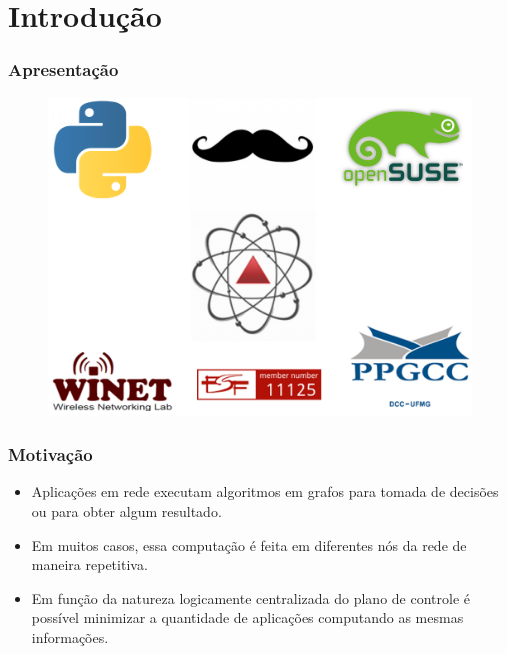 %
%
\section{Introdução}


%
%
\begin{frame}\frametitle{Apresentação}

	\begin{figure}[h]
        \centering
        \includegraphics[scale=0.25]{images/community.png}
    \end{figure}
\end{frame}


%
%
\begin{frame}\frametitle{Motivação}
   
    \begin{itemize}
        \setlength{\itemsep}{1cm}
        \item Aplicações em rede executam algoritmos em grafos para tomada de
            decisões ou para obter algum resultado.
        \item Em muitos casos, essa computação é feita em diferentes nós da 
            rede de maneira repetitiva.
        \item Em função da natureza logicamente centralizada do plano 
            de controle é possível minimizar a quantidade de aplicações 
            computando as mesmas informações. 
    \end{itemize}
\end{frame}



